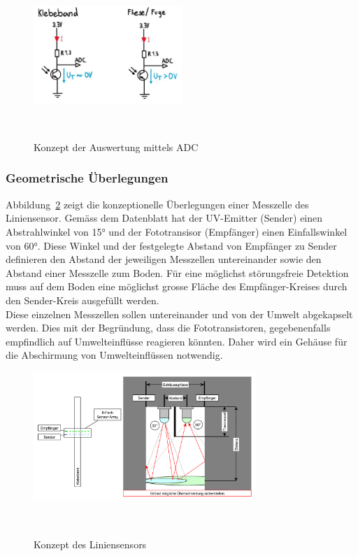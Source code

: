 \documentclass[main.tex]{subfiles} %
\begin{document}
\begin{figure}[H]
    \centering
    \includegraphics[width=0.5\textwidth]{fig_Strecke_Tracken/Auswertung_Liniensensor.pdf}
    \caption{Konzept der Auswertung mittels ADC}~\label{fig:Auswertung_Liniensesor}
\end{figure}

\subsubsection{Geometrische Überlegungen}
Abbildung~\ref{fig:Konzept_graphml} zeigt die konzeptionelle Überlegungen einer Messzelle des
Liniensensor. Gemäss dem Datenblatt hat der UV-Emitter (Sender) einen Abstrahlwinkel von 15° und der
Fototransisor (Empfänger) einen Einfallswinkel von 60°. Diese Winkel und der festgelegte Abstand von 
Empfänger zu Sender definieren den Abstand der jeweiligen Messzellen untereinander sowie den
Abstand einer Messzelle zum Boden. Für eine möglichst störungsfreie Detektion muss auf dem Boden 
eine möglichst grosse Fläche des Empfänger-Kreises durch den Sender-Kreis ausgefüllt werden.\\
Diese einzelnen Messzellen sollen untereinander und von der Umwelt abgekapselt werden. Dies
mit der Begründung, dass die Fototransistoren, gegebenenfalls empfindlich auf
Umwelteinflüsse reagieren könnten. Daher wird ein Gehäuse für die Abschirmung von Umwelteinflüssen
notwendig.

\begin{figure}[H]
    \centering
    \includegraphics[width=0.75\textwidth]{fig_Strecke_Tracken/Konzept.pdf}
    \caption{Konzept des Liniensensors}~\label{fig:Konzept_graphml}
\end{figure}
\end{document}

